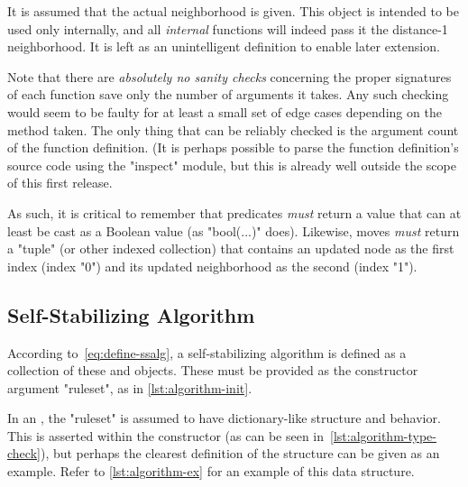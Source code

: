 \begin{warning}
  It is assumed that the actual neighborhood is given.
  This object is intended to be used only internally,
    and all \emph{internal} functions will indeed pass it the distance-1 neighborhood.
  It is left as an unintelligent definition to enable later extension.

  Note that there are \emph{absolutely no sanity checks} concerning
    the proper signatures of each function save only the number of arguments it takes.
  Any such checking would seem to be faulty for at least a small set of edge cases
    depending on the method taken.
  The only thing that can be reliably checked is the argument count of the function definition.
  (It is perhaps possible to parse the function definition's source code
    using the "inspect" module, but this is already well outside the scope of this first release.

  As such, it is critical to remember that predicates \emph{must} return a value
    that can at least be cast as a Boolean value (as "bool(...)" does).
  Likewise, moves \emph{must} return a "tuple" (or other indexed collection)
    that contains an updated node as the first index (index "0") and
    its updated neighborhood as the second (index "1").
\end{warning}

\subsection{Self-Stabilizing Algorithm}
\label{sec:logic-repr:self-stab-algor}

According to~\eqref{eq:define-ssalg},
  a self-stabilizing algorithm is defined as a collection
  of these  and  objects.
These must be provided as the constructor argument "ruleset",
  as in \autoref{lst:algorithm-init}.

In an , the "ruleset" is assumed to have
  dictionary-like structure and behavior.
This is asserted within the constructor (as can be seen in~\autoref{lst:algorithm-type-check}),
  but perhaps the clearest definition of the structure can be given as an example.
Refer to \autoref{lst:algorithm-ex} for an example of this data structure.


